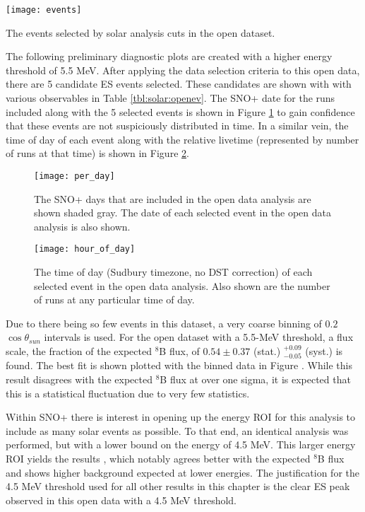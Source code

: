 \begin{table}
\centering
\texttt{[image: events]}
\caption{The events selected by solar analysis cuts in the open dataset.}
\label{tbl:solar:openev}
\end{table}

The following preliminary diagnostic plots are created with a higher energy threshold of 5.5 MeV.
After applying the data selection criteria to this open data, there are 5 candidate ES events selected.
These candidates are shown with with various observables in Table \ref{tbl:solar:openev}.
The SNO+ date for the runs included along with the 5 selected events is shown in Figure \ref{fig:solar:opendata} to gain confidence that these events are not suspiciously distributed in time.
In a similar vein, the time of day of each event along with the relative livetime (represented by number of runs at that time) is shown in Figure \ref{fig:solar:tod}.

\begin{figure}
\centering
\texttt{[image: per\_day]}
\caption{The SNO+ days that are included in the open data analysis are shown
         shaded gray.
         The date of each selected event in the open data analysis is also shown.}
\label{fig:solar:opendata}
\end{figure}


\begin{figure}
\centering
\texttt{[image: hour\_of\_day]}
\caption{The time of day (Sudbury timezone, no DST correction) of each selected
         event in the open data analysis.
         Also shown are the number of runs at any particular time of day.}
\label{fig:solar:tod}
\end{figure}


Due to there being so few events in this dataset, a very coarse binning of $0.2$ $\cos{\theta_{sun}}$ intervals is used.
For the open dataset with a 5.5-MeV threshold, a flux scale, the fraction of the expected $^8$B flux, of $0.54\pm0.37$ (stat.) $^{+0.09}_{-0.05}$ (syst.) is found.
The best fit is shown plotted with the binned data in Figure .
While this result disagrees with the expected $^8$B flux at over one sigma, it is expected that this is a statistical fluctuation due to very few statistics.

Within SNO+ there is interest in opening up the energy ROI for this analysis to include as many solar events as possible.
To that end, an identical analysis was performed, but with a lower bound on the energy of 4.5 MeV.
This larger energy ROI yields the results , which notably agrees better with the expected $^8$B flux and shows higher background expected at lower energies.
The justification for the 4.5 MeV threshold used for all other results in this chapter is the clear ES peak observed in this open data with a 4.5 MeV threshold.


